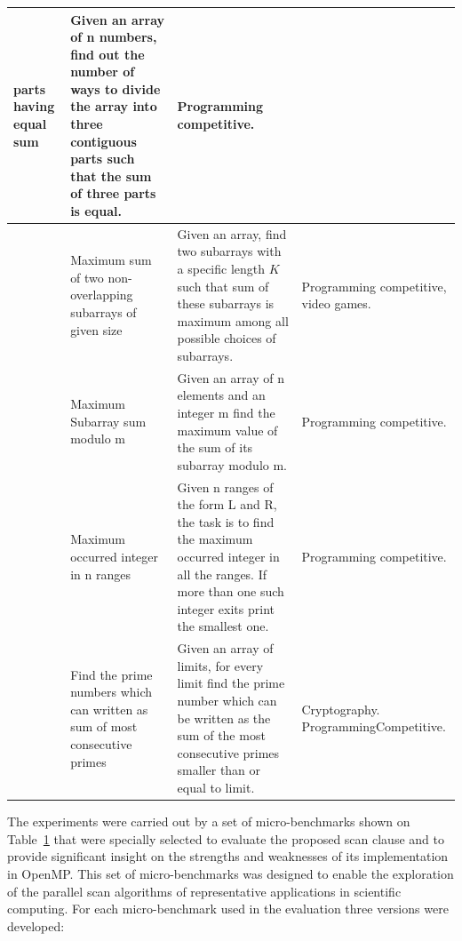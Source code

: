 \documentclass[Ingles]{ic-tese-v1}
\begin{document}
\begin{table}[!t]
\begin{adjustbox}{max width=1.1\textwidth, center}
\begin{tabular}{|>{\centering\arraybackslash}p{0.8cm}|p{5cm}|p{9cm}|p{5cm}|}
			parts having equal sum
			& Given an array of n numbers, find out the number of ways to
			divide the array into three contiguous parts such that the sum
			of three parts is equal.
			& Programming competitive.\\ \hline
			9   & Maximum sum of two non-overlapping subarrays of given size
			& Given an array, find two subarrays with a specific length $K$
			such that sum of these subarrays is maximum among all possible
			choices of subarrays.
			& Programming competitive, video games.\\ \hline
			10 & Maximum Subarray sum modulo m
			& Given an array of n elements and an integer m
			find the maximum value of the sum of its subarray modulo m.
			& Programming competitive.\\ \hline
			11 & Maximum occurred integer in n ranges
			& Given n ranges of the form L and R, the task is to find the
			maximum occurred integer in all the ranges. If more than one
			such integer exits print the smallest one.
			& Programming competitive.\\ \hline
			12 & Find the prime numbers which can written as sum of most
			consecutive primes
			& Given an array of limits, for every limit find the prime number
			which can be written as the sum of the most consecutive primes
			smaller than or equal to limit.
			& Cryptography. Programming\newline  Competitive.\\
			\hline
		\end{tabular}
	\end{adjustbox}
	\label{tab:benchmark}
\end{table}

The experiments were carried out by a set of micro-benchmarks
shown on  Table~\ref{tab:benchmark} that were specially selected to  evaluate
the  proposed scan clause  and to  provide significant
insight on the strengths and weaknesses of its  implementation in OpenMP.
This set of  micro-benchmarks was designed to  enable the exploration
of  the  parallel scan  algorithms  of  representative applications  in
scientific computing.  For each micro-benchmark  used  in   the  evaluation
three  versions  were developed:
\end{document}
